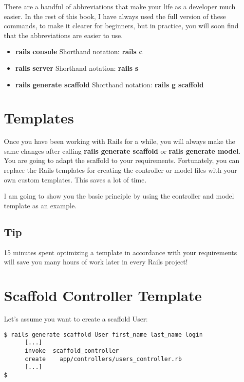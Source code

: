 \documentclass[a4paper]{book}
\begin{document}
There are a handful of abbreviations that make your life as a developer much easier. In the rest of this book, I have always used the full version of these commands, to make it clearer for beginners, but in practice, you will soon find that the abbreviations are easier to use.

\begin{itemize}
\itemsep1pt\parskip0pt
\item
  \textbf{rails console} Shorthand notation: \textbf{rails c}
\item
  \textbf{rails server} Shorthand notation: \textbf{rails s}
\item
  \textbf{rails generate scaffold} Shorthand notation: \textbf{rails g scaffold}
\end{itemize}

\section{Templates}\label{templates}

Once you have been working with Rails for a while, you will always make the same changes after calling \textbf{rails generate scaffold} or \textbf{rails generate model}. You are going to adapt the scaffold to your requirements. Fortunately, you can replace the Rails templates for creating the controller or model files with your own custom templates. This saves a lot of time.

I am going to show you the basic principle by using the controller and model template as an example.

\subsection{Tip}\label{tip-21}

15 minutes spent optimizing a template in accordance with your requirements will save you many hours of work later in every Rails project!

\section{Scaffold Controller Template}\label{scaffold-controller-template}

Let's assume you want to create a scaffold User:

\begin{shaded}\begin{verbatim}
$ rails generate scaffold User first_name last_name login
      [...]
      invoke  scaffold_controller
      create    app/controllers/users_controller.rb
      [...]
$
\end{verbatim}\end{shaded}
\end{document}

